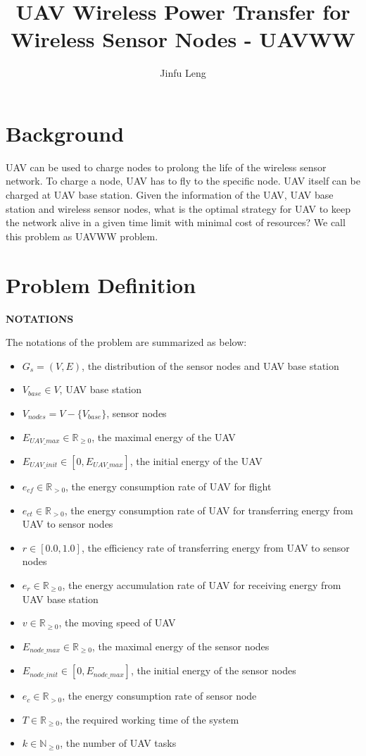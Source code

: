\documentclass[11pt]{article}
\begin{document}
\title{UAV Wireless Power Transfer for Wireless Sensor Nodes - UAVWW}
\author{Jinfu Leng}
\maketitle
\section{Background}
UAV can be used to charge nodes to prolong the life of the wireless sensor network. To charge a node, UAV has to fly to the specific node. UAV itself can be charged at UAV base station. Given the information of the UAV, UAV base station and wireless sensor nodes, what is the optimal strategy for UAV to keep the network alive in a given time limit with minimal cost of resources? We call this problem as UAVWW problem.

\section{Problem Definition}
\textbf{NOTATIONS}

The notations of the problem are summarized as below:
\begin{itemize}[noitemsep]
\item $G_s = (V, E)$, the distribution of the sensor nodes and UAV base station
\item $V_{base} \in V$, UAV base station
\item $V_{nodes} = V - \{V_{base}\}$, sensor nodes
\item $E_{UAV\_max} \in \mathbb{R}_{\geq0}$, the maximal energy of the UAV
\item $E_{UAV\_init} \in [0, E_{UAV\_max}]$, the initial energy of the UAV
\item $e_{cf} \in \mathbb{R}_{>0}$, the energy consumption rate of UAV for flight
\item $e_{ct} \in \mathbb{R}_{>0}$, the energy consumption rate of UAV for transferring energy from UAV to sensor nodes
\item $r \in [0.0, 1.0]$, the efficiency rate of transferring energy from UAV to sensor nodes
\item $e_r \in \mathbb{R}_{\geq0}$, the energy accumulation rate of UAV for receiving energy from UAV base station
\item $v \in \mathbb{R}_{\geq0}$, the moving speed of UAV
\item $E_{node\_max} \in \mathbb{R}_{\geq0}$, the maximal energy of the sensor nodes
\item $E_{node\_init} \in [0, E_{node\_max}]$, the initial energy of the sensor nodes
\item $e_{c} \in \mathbb{R}_{>0}$, the energy consumption rate of sensor node
\item $T \in \mathbb{R}_{\geq0}$, the required working time of the system
\item $k \in \mathbb{N}_{\geq0}$, the number of UAV tasks
\end{itemize}
\end{document}
